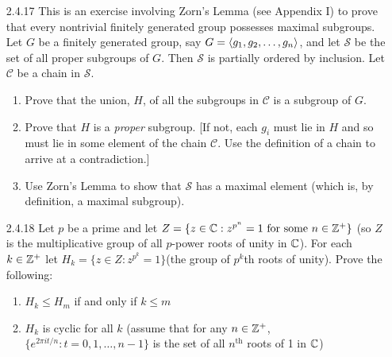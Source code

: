 \begin{enumerate}
\begin{enumerate}
                  \end{enumerate}
   \item[2.4.17]  This is an exercise involving Zorn's Lemma (see Appendix I) to
                  prove that every nontrivial finitely generated group possesses
                  maximal subgroups. Let $G$ be a finitely generated group, say
                  $G = \langle g_1, g_2, \ldots, g_n \rangle$, and let $\mathcal{S}$ be
                  the set of all proper subgroups of $G$. Then $\mathcal{S}$ is
                  partially ordered by inclusion. Let $\mathcal{C}$ be a chain
                  in $\mathcal{S}$.
                  \begin{enumerate}
                     \item Prove that the union, $H$, of all the subgroups in
                           $\mathcal{C}$ is a subgroup of $G$.
                     \item Prove that $H$ is a \textit{proper} subgroup. [If
                           not, each $g_i$ must lie in $H$ and so must lie in
                           some element of the chain $\mathcal{C}$. Use the
                           definition of a chain to arrive at a contradiction.]
                     \item Use Zorn's Lemma to show that $\mathcal{S}$ has a
                           maximal element (which is, by definition, a maximal
                           subgroup).
                  \end{enumerate}
   \item[2.4.18]  Let $p$ be a prime and let
                  $Z = \{z \in \mathbb{C} : z^{p^n} = 1 \text{ for some } n \in \mathbb{Z}^+\}$
                  (so $Z$ is the multiplicative group of all $p$-power roots of
                  unity in $\mathbb{C}$). For each $k \in \mathbb{Z}^+$ let
                  $H_k = \{z \in Z : z^{p^k} = 1\}$(the group of $p^k$th roots
                  of unity). Prove the following:
                  \begin{enumerate}
                     \item $H_k \le H_m$ if and only if $k \le m$
                     \item $H_k$ is cyclic for all $k$ (assume that for any
                           $n \in \mathbb{Z}^+$, $\{e^{2\pi it/n}:t =0,1,\ldots, n-1\}$
                           is the set of all $n^{\text{th}}$ roots of 1 in
                           $\mathbb{C}$)

\end{enumerate}
\end{enumerate}
